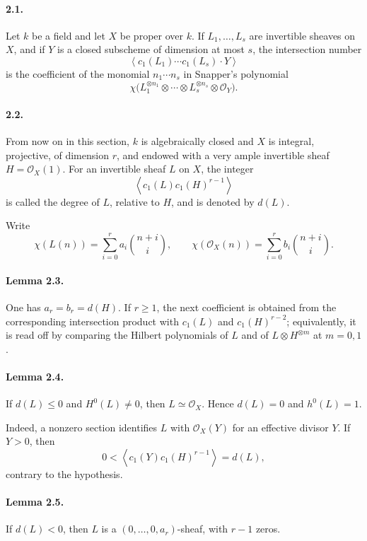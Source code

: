 \documentclass[12pt]{article}
\newcommand{\cO}{\mathcal O}
\begin{document}
\paragraph{2.1.}
Let $k$ be a field and let $X$ be proper over $k$. If $L_1,\ldots,L_s$ are invertible sheaves on $X$, and if $Y$ is a closed subscheme of dimension at most $s$, the intersection number
\[
\left\langle c_1(L_1)\cdots c_1(L_s)\cdot Y\right\rangle
\]
is the coefficient of the monomial $n_1\cdots n_s$ in Snapper's polynomial
\[
\chi\bigl(L_1^{\otimes n_1}\otimes\cdots\otimes L_s^{\otimes n_s}\otimes\cO_Y\bigr).
\]

\paragraph{2.2.}
From now on in this section, $k$ is algebraically closed and $X$ is integral, projective, of dimension $r$, and endowed with a very ample invertible sheaf $H=\cO_X(1)$. For an invertible sheaf $L$ on $X$, the integer
\[
\left\langle c_1(L)c_1(H)^{r-1}\right\rangle
\]
is called the degree of $L$, relative to $H$, and is denoted by $d(L)$.

Write
\[
\chi(L(n))=\sum_{i=0}^r a_i\binom{n+i}{i},\qquad
\chi(\cO_X(n))=\sum_{i=0}^r b_i\binom{n+i}{i}.
\]

\paragraph{Lemma 2.3.}
One has $a_r=b_r=d(H)$. If $r\geq1$, the next coefficient is obtained from the corresponding intersection product with $c_1(L)$ and $c_1(H)^{r-2}$; equivalently, it is read off by comparing the Hilbert polynomials of $L$ and of $L\otimes H^{\otimes m}$ at $m=0,1$.

\paragraph{Lemma 2.4.}
If $d(L)\leq0$ and $H^0(L)\neq0$, then $L\simeq\cO_X$. Hence $d(L)=0$ and $h^0(L)=1$.

Indeed, a nonzero section identifies $L$ with $\cO_X(Y)$ for an effective divisor $Y$. If $Y>0$, then
\[
0<\left\langle c_1(Y)c_1(H)^{r-1}\right\rangle=d(L),
\]
contrary to the hypothesis.

\paragraph{Lemma 2.5.}
If $d(L)<0$, then $L$ is a $(0,\ldots,0,a_r)$-sheaf, with $r-1$ zeros.
\end{document}
